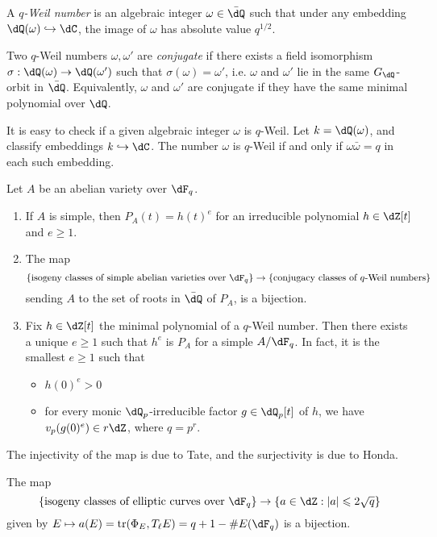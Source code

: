 \begin{definition}
A \emph{$q$-Weil number} is an algebraic integer $\omega\in \bar\dQ$ such that 
under any embedding $\dQ(\omega)\hookrightarrow\dC$, the image of $\omega$ has 
absolute value $q^{1/2}$. 
\end{definition}

Two $q$-Weil numbers $\omega,\omega'$ are \emph{conjugate} if there exists a 
field isomorphism $\sigma:\dQ(\omega) \to \dQ(\omega')$ such that 
$\sigma(\omega)=\omega'$, i.e. $\omega$ and $\omega'$ lie in the same 
$G_\dQ$-orbit in $\bar\dQ$. Equivalently, $\omega$ and $\omega'$ are conjugate 
if they have the same minimal polynomial over $\dQ$. 

It is easy to check if a given algebraic integer $\omega$ is $q$-Weil. Let 
$k=\dQ(\omega)$, and classify embeddings $k\hookrightarrow \dC$. The number 
$\omega$ is $q$-Weil if and only if $\omega\bar\omega = q$ in each such 
embedding.  

\begin{theorem}
Let $A$ be an abelian variety over $\dF_q$. 
\begin{enumerate}
  \item If $A$ is simple, then $P_A(t) = h(t)^e$ for an irreducible polynomial 
    $h\in \dZ[t]$ and $e\geqslant 1$.
  \item The map 
    \[
      \{\text{isogeny classes of simple abelian varieties over $\dF_q$}\} \to \{\text{conjugacy classes of $q$-Weil numbers}\}
    \]
    sending $A$ to the set of roots in $\bar\dQ$ of $P_A$, is a bijection. 
  \item Fix $h\in \dZ[t]$ the minimal polynomial of a $q$-Weil number. Then 
    there exists a unique $e\geqslant 1$ such that $h^e$ is $P_A$ for a simple 
    $A/\dF_q$. In fact, it is the smallest $e\geqslant 1$ such that 
    \begin{itemize}
      \item $h(0)^e>0$ 
      \item for every monic $\dQ_p$-irreducible factor $g\in \dQ_p[t]$ of $h$, 
        we have $v_p(g(0)^e)\in r\dZ$, where $q=p^r$. 
     \end{itemize}
\end{enumerate}
\end{theorem}

The injectivity of the map is due to Tate, and the surjectivity is due to 
Honda. 

\begin{corollary}
The map 
\[
  \{\text{isogeny classes of elliptic curves over $\dF_q$}\} \to \{a\in \dZ:|a|\leqslant 2\sqrt q\}
\]
given by $E\mapsto a(E)=\trace(\Phi_E,T_\ell E) = q+1-\# E(\dF_q)$ is a bijection. 
\end{corollary}

